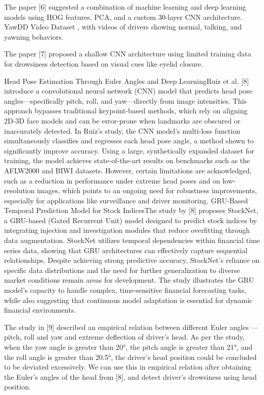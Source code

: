 \documentclass[a4paper,12pt]{report}
\begin{document}
The paper [6] suggested a combination of machine learning and deep learning models using HOG features, PCA, and a custom 30-layer CNN architecture. YawDD Video Dataset , with videos of drivers showing normal, talking, and yawning behaviors.

The paper [7] proposed a shallow CNN architecture using limited training data for drowsiness detection based on visual cues like eyelid closure.

Head Pose Estimation Through Euler Angles and Deep LearningRuiz et al. [8] introduce a convolutional neural network (CNN) model that predicts head pose angles—specifically pitch, roll, and yaw—directly from image intensities. This approach bypasses traditional keypoint-based methods, which rely on aligning 2D-3D face models and can be error-prone when landmarks are obscured or inaccurately detected. In Ruiz’s study, the CNN model’s multi-loss function simultaneously classifies and regresses each head pose angle, a method shown to significantly improve accuracy. Using a large, synthetically expanded dataset for training, the model achieves state-of-the-art results on benchmarks such as the AFLW2000 and BIWI datasets.
However, certain limitations are acknowledged, such as a reduction in performance under extreme head poses and on low-resolution images, which points to an ongoing need for robustness improvements, especially for applications like surveillance and driver monitoring.
GRU-Based Temporal Prediction Model for Stock IndicesThe study by [8] proposes StockNet, a GRU-based (Gated Recurrent Unit) model designed to predict stock indices by integrating injection and investigation modules that reduce overfitting through data augmentation. 
StockNet utilizes temporal dependencies within financial time series data, showing that GRU architectures can effectively capture sequential relationships. Despite achieving strong predictive accuracy, StockNet’s reliance on specific data distributions and the need for further generalization to diverse market conditions remain areas for development. The study illustrates the GRU model's capacity to handle complex, time-sensitive financial forecasting tasks, while also suggesting that continuous model adaptation is essential for dynamic financial environments.

The study in [9] described an empirical relation between different Euler angles --- pitch, roll and yaw and extreme deflection of driver's head. As per the study, when the yaw angle is greater than 20°, the pitch angle is greater than 21°, and the roll angle is greater than 20.5°, the driver’s head position could be concluded to be deviated excessively. 
We can use this in empirical relation after obtaining the Euler's angles of the head from [8], and detect driver's drowsiness using head position.
\end{document}
